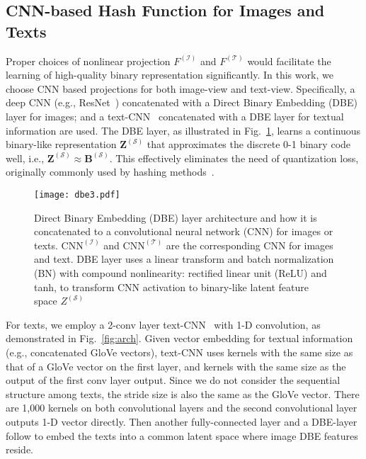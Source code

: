 \documentclass[10pt,twocolumn,letterpaper]{article}
\begin{document}
\subsection{CNN-based Hash Function for Images and Texts}
Proper choices of nonlinear projection $F^{(\mathcal{I})}$ and $F^{(\mathcal{T})}$ would facilitate the learning of high-quality binary representation significantly. In this work, we choose CNN based projections for both image-view and text-view. Specifically, a deep CNN (e.g., ResNet~\cite{He_2016_CVPR}) concatenated with a Direct Binary Embedding (DBE)~\cite{dbe} layer for images; and a text-CNN~\cite{text_cnn} concatenated with a DBE layer for textual information are used. The DBE layer, as illustrated in Fig.~\ref{fig:dbe}, learns a continuous binary-like representation $\mathbf{Z}^{(\mathcal{S})}$ that approximates the discrete 0-1 binary code  well, i.e., $\mathbf{Z}^{(\mathcal{S})}\approx \mathbf{B}^{(\mathcal{S})}$. This effectively eliminates the need of quantization loss, originally commonly used by hashing methods~\cite{Shen_2015_CVPR,acq,dcmh,dhn}.
\vspace{-2mm}
\begin{figure}[h]
	\centering
    		  \texttt{[image: dbe3.pdf]}
  	\caption{Direct Binary Embedding (DBE) layer architecture and how it is concatenated to a convolutional neural network (CNN) for images or texts. $\text{CNN}^{(\mathcal{I})}$ and $\text{CNN}^{(\mathcal{T})}$ are the corresponding CNN for images and text. DBE layer uses a linear transform and batch normalization (BN) with compound nonlinearity: rectified linear unit (ReLU) and tanh, to transform CNN activation to binary-like latent feature space $Z^{(\mathcal{S})}$}
\label{fig:dbe}
\end{figure}

For texts, we employ a 2-conv layer text-CNN~\cite{text_cnn} with 1-D convolution, as demonstrated in Fig.~\ref{fig:arch}. Given vector embedding for textual information (e.g., concatenated GloVe vectors), text-CNN uses kernels with the same size as that of a GloVe vector on the first layer, and kernels with the same size as the output of the first conv layer output. Since we do not consider the sequential structure among texts, the stride size is also the same as the GloVe vector. There are 1,000 kernels on both convolutional layers and the second convolutional layer outputs 1-D vector directly. Then another fully-connected layer and a DBE-layer follow to embed the texts into a common latent space where image DBE features reside.
\end{document}
